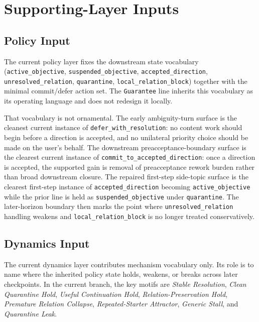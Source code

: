 \documentclass[11pt]{article}
\begin{document}
\section{Supporting-Layer Inputs}

\subsection{Policy Input}

The current policy layer fixes the downstream state vocabulary
(\texttt{active\_objective}, \texttt{suspended\_objective},
\texttt{accepted\_direction}, \texttt{unresolved\_relation},
\texttt{quarantine}, \texttt{local\_relation\_block}) together with the minimal
commit/defer action set. The \texttt{Guarantee} line inherits this vocabulary as
its operating language and does not redesign it locally.

That vocabulary is not ornamental. The early ambiguity-turn surface is the
cleanest current instance of \texttt{defer\_with\_resolution}: no content work
should begin before a direction is accepted, and no unilateral priority choice
should be made on the user's behalf. The downstream preacceptance-boundary
surface is the clearest current instance of
\texttt{commit\_to\_accepted\_direction}: once a direction is accepted, the
supported gain is removal of preacceptance rework burden rather than broad
downstream closure. The repaired first-step side-topic surface is the clearest
first-step instance of \texttt{accepted\_direction} becoming
\texttt{active\_objective} while the prior line is held as
\texttt{suspended\_objective} under \texttt{quarantine}. The later-horizon
boundary then marks the point where \texttt{unresolved\_relation} handling
weakens and \texttt{local\_relation\_block} is no longer treated conservatively.

\subsection{Dynamics Input}

The current dynamics layer contributes mechanism vocabulary only. Its role is to
name where the inherited policy state holds, weakens, or breaks across later
checkpoints. In the current branch, the key motifs are \textit{Stable
Resolution}, \textit{Clean Quarantine Hold}, \textit{Useful Continuation Hold},
\textit{Relation-Preservation Hold}, \textit{Premature Relation Collapse},
\textit{Repeated-Starter Attractor}, \textit{Generic Stall}, and
\textit{Quarantine Leak}.
\end{document}
